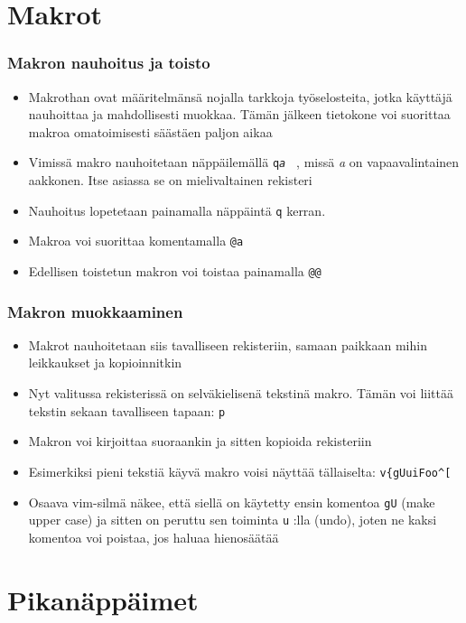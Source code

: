 \documentclass[]{beamer}
\newcommand{\Tohj}[1]{\texttt{#1}}
\newcommand{\com}[1]{{\color{blue!50!black}\Tohj{#1}} \!\!}
\begin{document}
\section{Makrot}

\begin{frame}
    \frametitle{Makron nauhoitus ja toisto}
    \begin{itemize}
        \item Makrothan ovat määritelmänsä nojalla tarkkoja työselosteita, jotka käyttäjä nauhoittaa ja mahdollisesti muokkaa. Tämän jälkeen tietokone voi suorittaa makroa omatoimisesti säästäen paljon aikaa 
        \item Vimissä makro nauhoitetaan näppäilemällä \com{q{\color{red}\emph{a}} }, missä {\color{red}\emph{a}} on vapaavalintainen aakkonen. Itse asiassa se on mielivaltainen rekisteri
        \pause
        \item Nauhoitus lopetetaan painamalla näppäintä \com{q} kerran.
        \item Makroa voi suorittaa komentamalla \com{@{\color{red}a}}
        \item Edellisen toistetun makron voi toistaa painamalla \com{@@}
    \end{itemize}
\end{frame}

\begin{frame}[fragile]
    \frametitle{Makron muokkaaminen}
    \begin{itemize}
        \item Makrot nauhoitetaan siis tavalliseen rekisteriin, samaan paikkaan mihin leikkaukset ja kopioinnitkin
        \item Nyt valitussa rekisterissä on selväkielisenä tekstinä makro. Tämän voi liittää tekstin sekaan tavalliseen tapaan: \com{p}
        \item Makron voi kirjoittaa suoraankin ja sitten kopioida rekisteriin
        \pause
        \item Esimerkiksi pieni tekstiä käyvä makro voisi näyttää tällaiselta: \verb|v{gUuiFoo^[|
        \item Osaava vim-silmä näkee, että siellä on käytetty ensin komentoa \com{gU} (make upper case) ja sitten on peruttu sen toiminta \com{u}:lla (undo), joten ne kaksi komentoa voi poistaa, jos haluaa hienosäätää
    \end{itemize}
\end{frame}

\section{Pikanäppäimet}
\end{document}
